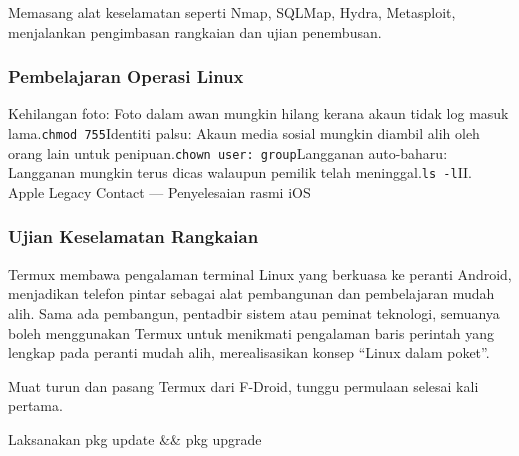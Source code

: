Memasang alat keselamatan seperti Nmap, SQLMap, Hydra, Metasploit, menjalankan pengimbasan rangkaian dan ujian penembusan.

\subsubsection*{Pembelajaran Operasi Linux}

Kehilangan foto: Foto dalam awan mungkin hilang kerana akaun tidak log masuk lama.\texttt{chmod 755}Identiti palsu: Akaun media sosial mungkin diambil alih oleh orang lain untuk penipuan.\texttt{chown user: group}Langganan auto-baharu: Langganan mungkin terus dicas walaupun pemilik telah meninggal.\texttt{ls -\allowbreak l}II. Apple Legacy Contact — Penyelesaian rasmi iOS

\subsubsection*{Ujian Keselamatan Rangkaian}

Termux membawa pengalaman terminal Linux yang berkuasa ke peranti Android, menjadikan telefon pintar sebagai alat pembangunan dan pembelajaran mudah alih. Sama ada pembangun, pentadbir sistem atau peminat teknologi, semuanya boleh menggunakan Termux untuk menikmati pengalaman baris perintah yang lengkap pada peranti mudah alih, merealisasikan konsep “Linux dalam poket”.


Muat turun dan pasang Termux dari F-Droid, tunggu permulaan selesai kali pertama.

\begin{tcbinfo}{Laksanakan}
pkg update \&\& pkg upgrade

\end{tcbinfo}

